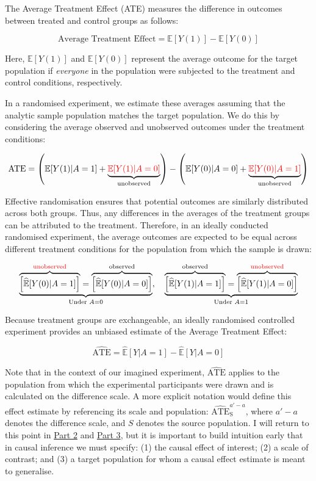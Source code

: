 \documentclass[
  single column]{article}
\begin{document}
The Average Treatment Effect (ATE) measures the difference in outcomes
between treated and control groups as follows:

\[
\text{Average Treatment Effect} = \mathbb{E}[Y(1)] - \mathbb{E}[Y(0)]
\]

Here, \(\mathbb{E}[Y(1)]\) and \(\mathbb{E}[Y(0)]\) represent the
average outcome for the target population if \emph{everyone} in the
population were subjected to the treatment and control conditions,
respectively.

In a randomised experiment, we estimate these averages assuming that the
analytic sample population matches the target population. We do this by
considering the average observed and unobserved outcomes under the
treatment conditions:

\[
\text{ATE} = \left(\mathbb{E}[Y(1) | A = 1] + \underbrace{\textcolor{red}{\mathbb{E}[Y(1) | A = 0]}}_{\text{unobserved}}\right) - \left(\mathbb{E}[Y(0) | A = 0] + \underbrace{\textcolor{red}{\mathbb{E}[Y(0) | A = 1]}}_{\text{unobserved}}\right)
\]

Effective randomisation ensures that potential outcomes are similarly
distributed across both groups. Thus, any differences in the averages of
the treatment groups can be attributed to the treatment. Therefore, in
an ideally conducted randomised experiment, the average outcomes are
expected to be equal across different treatment conditions for the
population from which the sample is drawn:

\[
\underbrace{\overbrace{\left[\widehat{\mathbb{E}}[Y(0) | A = 1]\right]}^{\textcolor{red}{\text{unobserved}}} = \overbrace{\left[\widehat{\mathbb{E}}[Y(0) | A = 0]\right]}^{\text{observed}}}_{\text{Under } A = 0}, \quad \underbrace{\overbrace{\left[\widehat{\mathbb{E}}[Y(1) | A = 1]\right]}^{\text{observed}} = \overbrace{\left[\widehat{\mathbb{E}}[Y(1) | A = 0]\right]}^{\textcolor{red}{\text{unobserved}}}}_{\text{Under } A = 1}
\]

Because treatment groups are exchangeable, an ideally randomised
controlled experiment provides an unbiased estimate of the Average
Treatment Effect:

\[
\widehat{\text{ATE}} = \widehat{\mathbb{E}}[Y | A = 1] - \widehat{\mathbb{E}}[Y | A = 0]
\]

Note that in the context of our imagined experiment,
\(\widehat{\text{ATE}}\) applies to the population from which the
experimental participants were drawn and is calculated on the difference
scale. A more explicit notation would define this effect estimate by
referencing its scale and population:
\(\widehat{\text{ATE}}^{a'-a}_{\text{S}}\), where \(a'-a\) denotes the
difference scale, and \(S\) denotes the source population. I will return
to this point in \hyperref[id-sec-2]{Part 2} and
\hyperref[id-sec-3]{Part 3}, but it is important to build intuition
early that in causal inference we must specify: (1) the causal effect of
interest; (2) a scale of contrast; and (3) a target population for whom
a causal effect estimate is meant to generalise.
\end{document}

